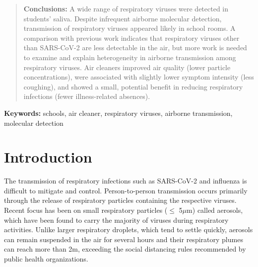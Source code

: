\documentclass[fleqn,11pt]{wlscirep}
\begin{document}
\begin{abstract}

\noindent\textbf{Conclusions:} A wide range of respiratory viruses were detected in students' saliva. Despite infrequent airborne molecular detection, transmission of respiratory viruses appeared likely in school rooms. A comparison with previous work indicates that respiratory viruses other than SARS-CoV-2 are less detectable in the air, but more work is needed to examine and explain heterogeneity in airborne transmission among respiratory viruses. Air cleaners improved air quality (lower particle concentrations), were associated with slightly lower symptom intensity (less coughing), and showed a small, potential benefit in reducing respiratory infections (fewer illness-related absences).

\par
\end{abstract}


\flushbottom
\maketitle
\setcounter{page}{1}
\thispagestyle{fancy}

\vspace{2em}


\vspace{0.5em}

\noindent\textbf{Keywords:} schools, air cleaner, respiratory viruses, airborne transmission, molecular detection
\newpage

\sloppy
\raggedbottom

\newpage

\section{Introduction} 

The transmission of respiratory infections such as SARS-CoV-2 and influenza is difficult to mitigate and control. Person-to-person transmission occurs primarily through the release of respiratory particles containing the respective viruses. Recent focus has been on small respiratory particles ($\leq$ 5$\mu$m) called aerosols, which have been found to carry the majority of viruses during respiratory activities\cite{Fennelly2020}. Unlike larger respiratory droplets, which tend to settle quickly, aerosols can remain suspended in the air for several hours and their respiratory plumes can reach more than 2m\cite{Coleman2022,Wang2020,Heneghan2021}, exceeding the social distancing rules recommended by public health organizations\cite{Bazant2021PNAS,Trivedi2021PhyFluids,Lindsley2010CID}. 
\end{document}
